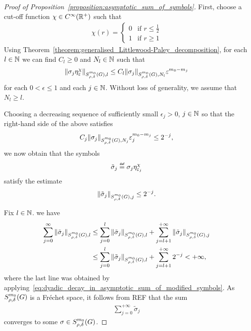 \begin{proof}[Proof of Proposition~\ref{proposition:asymptotic_sum_of_symbols}]
    First, choose a cut-off function $\chi \in \SmoothFunctions {\R^+}$ such that
    \begin{align*}
        \chi(r) =
        \begin{cases}
            0 & \text{if } r \leq \frac 1 2\\
            1 & \text{if } r \geq 1
        \end{cases}
    \end{align*}
    Using Theorem~\ref{theorem:generalised_Littlewood-Paley_decomposition},
    for each $l \in \N$ we can find $C_l \geq 0$ and $N_l \in \N$ such that
    \begin{align*}
        \SymbolSemiNorm {m_0} {\rho, \delta} l {\sigma_j \eta^\chi_\epsilon}
        \leq C_l \SymbolSemiNorm {m_0} {\rho, \delta} {N_l} {\sigma_j}
        \epsilon^{m_0 - m_j}
    \end{align*}
    for each $0 < \epsilon \leq 1$ and each $j \in \N$.
    Without loss of generality,
    we assume that $N_l \geq l$.

    Choosing a decreasing sequence of sufficiently small $\epsilon_j > 0$, $j \in \N$
    so that the right-hand side of the above satisfies
    \begin{align*}
        C_j \SymbolSemiNorm {m_0} {\rho, \delta} {N_j} {\sigma_j} \epsilon_j^{m_0 - m_j}
        \leq 2^{-j},
    \end{align*}
    we now obtain that the symbols
    \begin{align*}
        \tilde \sigma_j \defeq \sigma_j \eta^\chi_{\epsilon_j}
    \end{align*}
    satisfy the estimate
    \begin{align}
        \SymbolSemiNorm {m_0} {\rho, \delta} j {\tilde \sigma_j}
        \leq 2^{-j}.
        \label{eq:dyadic_decay_in_asymptotic_sum_of_modified_symbols}
    \end{align}

    Fix $l \in \N$.
    we have
    \begin{align}
        \sum_{j = 0}^\infty \SymbolSemiNorm {m_0} {\rho, \delta} l {\tilde \sigma_j}
        &\leq \sum_{j = 0}^l \SymbolSemiNorm {m_0} {\rho, \delta} l {\tilde \sigma_j}
        + \sum_{j = l + 1}^{+\infty} \SymbolSemiNorm {m_0} {\rho, \delta} {j} {\tilde \sigma_j} \notag\\
        &\leq \sum_{j = 0}^l \SymbolSemiNorm {m_0} {\rho, \delta} l {\tilde \sigma_j}
        + \sum_{j = l + 1}^{+\infty} 2^{-j} < + \infty,
        \label{eq:convergence_of_asymptotic_sum_of_modified_symbols}
    \end{align}
    where the last line was obtained by applying~\eqref{eq:dyadic_decay_in_asymptotic_sum_of_modified_symbols}.
    As $\SymbolClass {m_0} {\rho, \delta}$ is a Fr\'echet space,
    it follows from REF that the sum
    \begin{align*}
        \sum_{j = 0}^{+\infty} \tilde \sigma_j
    \end{align*}
    converges to some $\sigma \in \SymbolClass {m_0} {\rho, \delta}$.


\end{proof}

